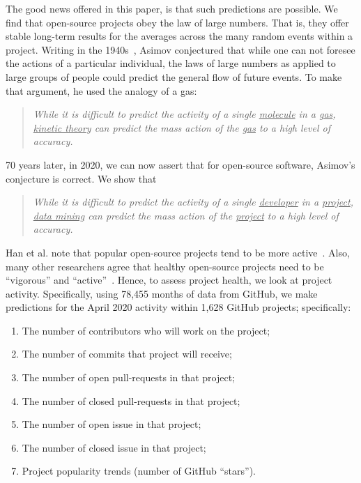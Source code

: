 \documentclass[sigconf,anonymous,review]{acmart}
\begin{document}
The good news offered in  this paper, is that such predictions are possible.
We find that open-source projects obey the law of large numbers.
That is, they offer   stable long-term results for the averages across the many random events within a project.
 Writing in the 1940s~\cite{asimov50},  Asimov conjectured that while one can not foresee the actions of a particular individual, the laws of large numbers as applied to large groups of people could predict the general flow of future events. To make that argument, he
 used the analogy of a gas: 
 \begin{quote}
 {\em  While it is  difficult to  predict the activity of a
 single 
 \underline{molecule} in a 
 \underline{gas},       \underline{kinetic theory} can predict the mass action of the \underline{ gas} to a high level of accuracy. }
 \end{quote}
 70 years later, in 2020, we can now assert that for open-source software,  Asimov's conjecture is correct. We  show that
 \begin{quote}
 {\em While it is  difficult to  predict the  activity of a single \underline{developer} in a \underline{project}, 
    \underline{data mining} can predict the mass action of 
 the \underline{project} to a high level of accuracy.}
 \end{quote}
 Han et al. note
 that popular open-source projects tend to be more active~\cite{han2019characterization}. Also, many other researchers agree that healthy open-source projects need to be ``vigorous'' and ``active''~\cite{wahyudin2007monitoring,jansen2014measuring,manikas2013reviewing,link2018assessing,wynn2007assessing,crowston2006assessing}.  Hence, to assess project health, we look at project activity.
Specifically,  using  78,455 months of data from  GitHub,  we make predictions for the   April 2020 activity within 1,628 GitHub projects;  specifically: 
 \begin{enumerate}
 \item The number of contributors who will work on the project; 
 \item The number of commits that project will receive;
 \item The number of open pull-requests in that project;
 \item The number of closed pull-requests in that project;
  \item The number of open issue in that project;
 \item The number of closed issue in that project;
 \item Project popularity trends (number of GitHub ``stars'').
 \end{enumerate}
 
\end{document}
